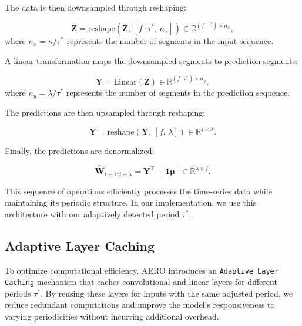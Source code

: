 The data is then downsampled through reshaping:

\begin{equation}
\label{eq:downsampling}
\mathbf{Z} = \text{reshape}\left( \mathbf{Z},\, \left[ f \cdot \tau^{\ast},\, n_x \right] \right) \in \mathbb{R}^{(f \cdot \tau^{\ast}) \times n_x},
\end{equation}
where $n_x = \kappa / \tau^{\ast}$ represents the number of segments in the input sequence.

A linear transformation maps the downsampled segments to prediction segments:

\begin{equation}
\label{eq:linear_mapping}
\mathbf{Y} = \text{Linear}\left( \mathbf{Z} \right) \in \mathbb{R}^{(f \cdot \tau^{\ast}) \times n_y},
\end{equation}
where $n_y = \lambda / \tau^{\ast}$ represents the number of segments in the prediction sequence.

The predictions are then upsampled through reshaping:

\begin{equation}
\label{eq:upsampling}
\mathbf{Y} = \text{reshape}\left( \mathbf{Y},\, \left[ f,\, \lambda \right] \right) \in \mathbb{R}^{f \times \lambda}.
\end{equation}

Finally, the predictions are denormalized:

\begin{equation}
\label{eq:denormalization}
\hat{\mathbf{W}}_{t+1:t+\lambda} = \mathbf{Y}^\top + \mathbf{1} \boldsymbol{\mu}^\top \in \mathbb{R}^{\lambda \times f}.
\end{equation}

This sequence of operations efficiently processes the time-series data while maintaining its periodic structure. In our implementation, we use this architecture with our adaptively detected period $\tau^{\ast}$.


\subsection{Adaptive Layer Caching}
\label{sec:ch3_adaptive_layer_caching}

To optimize computational efficiency, \ac{AERO} introduces an \texttt{Adaptive Layer Caching} mechanism that caches convolutional and linear layers for different periods $\tau^{\ast}$. By reusing these layers for inputs with the same adjusted period, we reduce redundant computations and improve the model's responsiveness to varying periodicities without incurring additional overhead.


